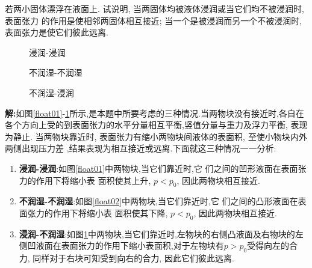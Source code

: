 \begin{problem}[问题1.3]
若两小固体漂浮在液面上. 试说明, 当两固体均被液体浸润或当它们均不被浸润时, 表面张力
的作用是使相邻两固体相互接近; 当一个是被浸润而另一个不被浸润时, 表面张力是使它们彼此远离.
\end{problem}
\begin{solution}
\begin{figure}[!htb]
\begin{minipage}[b]{.33\textwidth}
\centering

\caption{\label{float01}浸润-浸润}
\end{minipage}%
\begin{minipage}[b]{.33\textwidth}
\centering

\caption{\label{float02}不润湿-不润湿}
\end{minipage}
\begin{minipage}[b]{.33\textwidth}
\centering

\caption{\label{float03}不润湿-浸润}
\end{minipage}
\end{figure}
\textbf{解:}如图\ref{float01}-\ref{float03}所示,是本题中所要考虑的三种情况.当两物块没有接近时,各自在各个方向上受的到表面张力的水平分量相互平衡,竖值分量与重力及浮力平衡, 表现为静止.
当两物块靠近时,
表面张力有缩小两物块间液体的表面积, 至使小物块内外两侧出现压力差
,结果表现为相互接近或远离.下面就这三种情况一一分析:
\begin{enumerate}
\item \textbf{浸润-浸润}:如图\ref{float01}中两物块,当它们靠近时,它
们之间的凹形液面在表面张力的作用下将缩小表
面积使其上升, $p<p_0$, 因此两物块相互接近.
\item \textbf{不润湿-不润湿}:如图\ref{float02}中两物块,当它们靠近时,它
们之间的凸形液面在表面张力的作用下将缩小表
面积使其下降, $p<p_0$, 因此两物块相互接近.
\item \textbf{浸润-不润湿}:如图\ref{float03}中两物块,当它们靠近时,左物块的右侧凸液面及右物块的左侧凹液面在表面张力的作用下缩小表面积,对于左物块有$p>p_0$受得向左的合力, 同样对于右块可知受到向右的合力, 因此它们彼此远离.
\end{enumerate}
\end{solution}
